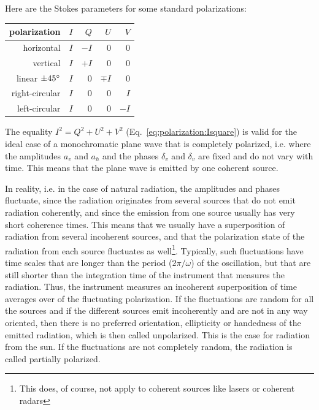 Here are the Stokes parameters for some standard polarizations:
\begin{center}
\label{stokes-examples}
\begin{tabular}{r@{\hspace{2em}(}r@{,}r@{,}r@{,}r@{)}}
\hline
polarization & $I$ &   $Q$   &   $U$  &   $V$ \\ \hline
horizontal   & $I$ &  $-I$   &    0   &   0   \\ 
vertical     & $I$ &  $+I$   &    0   &   0   \\ 
linear $\pm 45^\circ$
             & $I$ &   0     &$\mp I$ &   0   \\ 
right-circular& $I$ &  0     &    0   &   $I$ \\ 
left-circular& $I$ &   0     &    0   &  $-I$ \\ \hline
\end{tabular}
\end{center}



\label{sec:polarization:part_pol}
The equality   $I^2 = Q^2 + U^2 + V^2$
(Eq.~\ref{eq:polarization:Isquare}) 
is valid for the ideal case of a 
monochromatic plane wave that is completely polarized, i.e. where the
amplitudes $a_v$ and
$a_h$ and the phases $\delta_v$ and $\delta_v$ are fixed and do not
vary with time. This means that the plane wave is emitted by one
coherent source.

In reality, i.e. in the case of natural radiation, 
the amplitudes and phases fluctuate, since the radiation
originates from several sources that do not emit radiation coherently,
and since the emission from one source usually has very short
coherence times. This
means that we usually have a superposition of radiation from several incoherent
sources, and that the polarization state of the radiation from each
source fluctuates as well\footnote{This does, of course, not apply to
  coherent sources like lasers or coherent radars}. 
Typically, such fluctuations have time scales that are longer than the
period ($2\pi/\omega$) of the oscillation, but that are still shorter
than the integration time of the instrument that measures the
radiation. Thus, the instrument measures an incoherent
 superposition of time averages
over of the fluctuating polarization. If the fluctuations are
random for all the sources and if the different sources emit 
incoherently and are not in any way oriented, then there is no preferred
orientation, ellipticity or handedness of the emitted radiation, which
is then called unpolarized. This is the case for radiation from the sun.
If the fluctuations are not completely random, the
radiation is called partially polarized.

